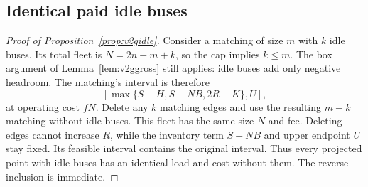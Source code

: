 \subsection{Identical paid idle buses}
\begin{proof}[Proof of Proposition~\ref{prop:v2gidle}]
Consider a matching of size $m$ with $k$ idle buses. Its total fleet is
$N=2n-m+k$, so the cap implies $k\le m$. The box argument of
Lemma~\ref{lem:v2ggross} still applies: idle buses add only negative
headroom. The matching's interval is therefore
\[
 [\max\{S-H,S-NB,2R-K\},U],
\]
at operating cost $fN$. Delete any $k$ matching edges and use the resulting
$m-k$ matching without idle buses. This fleet has the same size $N$ and
fee. Deleting edges cannot increase $R$, while the inventory term $S-NB$
and upper endpoint $U$ stay fixed. Its feasible interval contains the
original interval. Thus every projected point with idle buses has an
identical load and cost without them. The reverse inclusion is immediate.
\end{proof}
